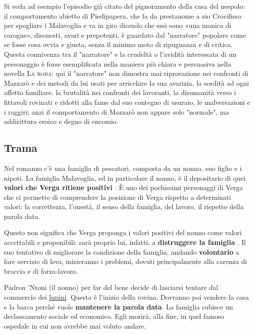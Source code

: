 \documentclass{book}
\newcommand{\evidenziatore}[1]{\textbf{#1}}
\begin{document}
Si veda ad esempio l'episodio già citato del pignoramento della casa del nespolo: il comportamento abietto di Piedipapera, che fa da prestanome a zio Crocifisso per spogliare i Malavoglia e va in giro dicendo che essi sono «una manica di carogne», disonesti, avari e prepotenti, è guardato dal "narratore" popolare come se fosse cosa ovvia e giusta, senza il minimo moto di ripugnanza e di critica. Questa connivenza tra il "narratore" e la crudeltà o l'avidità interessata di un personaggio è forse esemplificata nella maniera più chiara e persuasiva nella novella \textsc{La roba}: qui il "narratore" non dimostra mai riprovazione nei confronti di Mazzarò e dei metodi da lui usati per arricchire la sua avarizia, la sordità ad ogni affetto familiare, la brutalità nei confronti dei lavoranti, la disumanità verso i fittavoli rovinati e ridotti alla fame dal suo contegno di usuraio, le malversazioni e i raggiri; anzi il comportamento di Mazzarò non appare solo "normale", ma addirittura eroico e degno di encomio.

\subsection{Trama}

Nel romanzo c'è una famiglia di pescatori, composta da un nonno, suo
figlio e i nipoti. La famiglia Malavoglia, ed in particolare il nonno, è
il depositario di quei \evidenziatore{valori che Verga ritiene positivi}
. È uno dei pochissimi personaggi di Verga che ci permette di
comprendere la posizione di Verga rispetto a determinati valori: la
correttezza, l'onestà, il senso della famiglia, del lavoro, il rispetto
della parola data.

Questo non significa che Verga proponga i valori positivi del nonno come
valori accettabili e proponibili: sarà proprio lui, infatti, a
\evidenziatore{distruggere la famiglia} . Il suo tentativo di migliorare
la condizione della famiglia, andando \textbf{volontario} a fare
servizio di leva, inizieranno i problemi, dovuti principalmente alla
carenza di braccia e di forza-lavoro.

Padron 'Ntoni (il nonno) per far del bene decide di lasciarsi tentare
dal commercio dei
\href{https://it.wikipedia.org/wiki/Lupinus_albus}{lupini}. Questa è
l'inizio della rovina. Dovranno poi vendere la casa e la barca perché
vuole \textbf{mantenere la parola data}. La famiglia subisce un
declassamento sociale ed economico. Egli morirà, alla fine, in quel
famoso ospedale in cui non avrebbe mai voluto andare.
\end{document}
